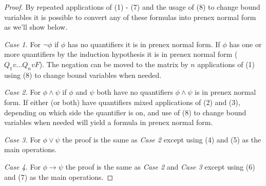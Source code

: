 \documentclass[a4paper,11pt]{article}
\begin{document}
\begin{proof}
		\smallskip
		
		By repeated applications of (1) - (7) and the usage of (8) to change bound variables 
		it is possible to convert any of these formulas into prenex normal form as we'll show below.
		
		\textit{Case 1.} For $\lnot \phi$ if $\phi$ has no quantifiers it is in prenex normal form. 
		If $\phi$ has one or more quantifiers by the induction hypothesis it is in prenex normal form 
		($Q_{1}v \dots Q_{n}v F$). The negation can be moved to the matrix by $n$ applications 
		of (1) using (8) to change bound variables when needed.
		
		\textit{Case 2.} For $\phi \land \psi$ if $\phi$ and $\psi$ both have no quantifiers $\phi \land \psi$
		is in prenex normal form. If either (or both) have quantifiers mixed applications of (2) and (3), 
		depending on which side the quantifier is on, and use of (8) to change bound variables when needed 
		will yield a formula in prenex normal form.
		
		\textit{Case 3.} For $\phi \lor \psi$ the proof is the same as \textit{Case 2} except using (4) and (5)
		as the main operations.
		
		\textit{Case 4.} For $\phi \rightarrow \psi$ the proof is the same as \textit{Case 2} and \textit{Case 3}
		except using (6) and (7) as the main operations.
		
		
	\end{proof}
	
\end{document}
